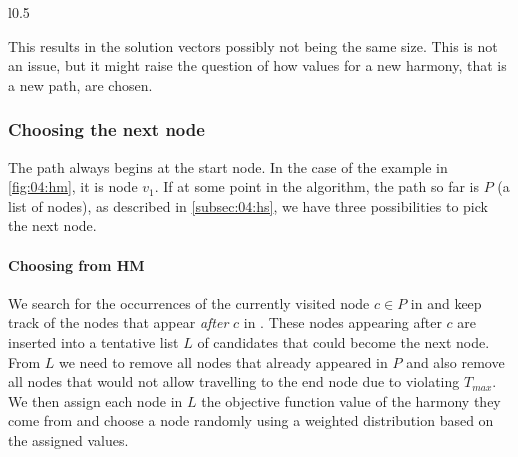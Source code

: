 \begin{wrapfigure}{l}{0.5\textwidth}
	\centering
	\caption{An example \hm{} with paths starting at node $v_1$ and ending at node $v_8$.}
	\label{fig:04:hm}
\end{wrapfigure}

This results in the solution vectors possibly not being the same size.
This is not an issue, but it might raise the question of how values for a new harmony, that is a new path, are chosen.

\subsubsection{Choosing the next node}

The path always begins at the start node. In the case of the example in \cref{fig:04:hm}, it is node $v_1$.
If at some point in the algorithm, the path so far is $P$ (a list of nodes), as described in \cref{subsec:04:hs}, we have three possibilities to pick the next node.

\paragraph{Choosing from HM}

We search for the occurrences of the currently visited node $c \in P$ in \hm{} and keep track of the nodes that appear \emph{after} $c$ in \hm{}.
These nodes appearing after $c$ are inserted into a tentative list $L$ of candidates that could become the next node.
From $L$ we need to remove all nodes that already appeared in $P$ and also remove all nodes that would not allow travelling to the end node due to violating $T_{max}$.
We then assign each node in $L$ the objective function value of the harmony they come from and choose a node randomly using a weighted distribution based on the assigned values.


